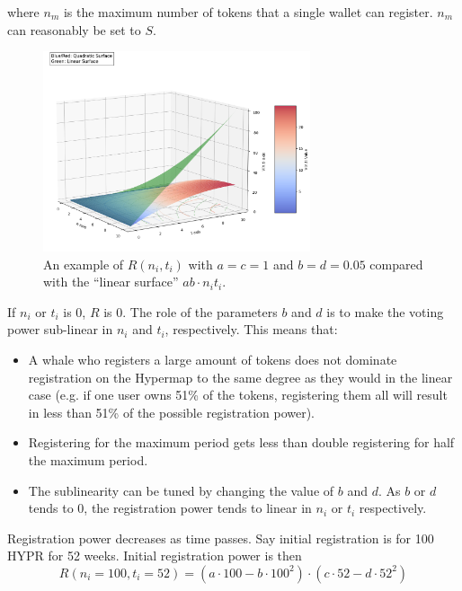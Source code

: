 \documentclass{article}
\begin{document}
where $n_m$ is the maximum number of tokens that a single wallet can register.
$n_m$ can reasonably be set to $S$.

\begin{figure}[h]
    \centering
    \includegraphics[width=0.7\textwidth]{voting-power-surface.png}
    \caption{An example of $R(n_i, t_i)$ with $a = c = 1$ and $b = d = 0.05$ compared with the ``linear surface'' $ab \cdot n_it_i$.}
    \label{fig:example-image}
\end{figure}

If $n_i$ or $t_i$ is $0$, $R$ is $0$.
The role of the parameters $b$ and $d$ is to make the voting power sub-linear in $n_i$ and $t_i$, respectively.
This means that:
\begin{itemize}
    \item A whale who registers a large amount of tokens does not dominate registration on the Hypermap to the same degree as they would in the linear case (e.g. if one user owns 51\% of the tokens, registering them all will result in less than 51\% of the possible registration power).
    \item Registering for the maximum period gets less than double registering for half the maximum period.
    \item The sublinearity can be tuned by changing the value of $b$ and $d$.
      As $b$ or $d$ tends to $0$, the registration power tends to linear in $n_i$ or $t_i$ respectively.
\end{itemize}

Registration power decreases as time passes.
Say initial registration is for 100 HYPR for 52 weeks.
Initial registration power is then
\begin{equation}
R(n_i=100, t_i=52) = (a\cdot 100 - b\cdot 100^2) \cdot (c\cdot 52 - d\cdot 52^2)
\end{equation}
\end{document}
